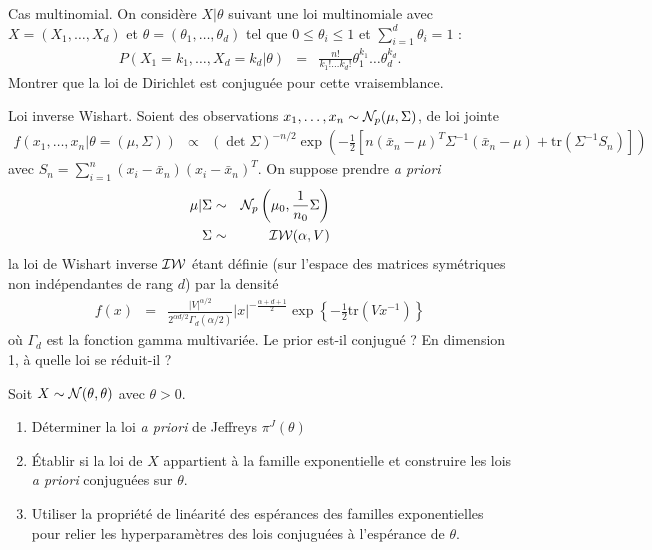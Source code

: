 \begin{exec}{Cas multinomial.}
On considère $X|\theta$ suivant une loi multinomiale avec $X=(X_1,\ldots,X_d)$ et $\theta=(\theta_1,\ldots,\theta_{d})$ tel que
$0\leq \theta_i \leq 1$ et $\sum_{i=1}^d \theta_i=1$ :
\begin{eqnarray*}
P(X_1=k_1,\ldots,X_d=k_d|\theta) & = & \frac{n!}{k_1!\ldots k_d!} \theta^{k_1}_1\ldots \theta^{k_d}_d.  
\end{eqnarray*}
Montrer que la loi de Dirichlet est conjuguée pour cette vraisemblance.
\end{exec}

\begin{exec}{Loi inverse Wishart.}
Soient des observations $x_1,\ldots,x_n\sim{\cal{N}}_p(\mu,\Sigma)$, de loi jointe
\begin{eqnarray*}
f(x_1,\ldots,x_n|\theta=(\mu,\Sigma)) & \propto & \left(\det \Sigma\right)^{-n/2} \exp\left(-\frac{1}{2}\left[n(\bar{x}_n-\mu)^T \Sigma^{-1} (\bar{x}_n-\mu) + \mbox{tr}(\Sigma^{-1} S_n)\right]\right)
\end{eqnarray*}
avec $S_n=\sum_{i=1}^n (x_i-\bar{x}_n)(x_i-\bar{x}_n)^T$. 
On suppose prendre {\it a priori}
\begin{eqnarray*}
\mu|\Sigma & \sim & {\cal{N}}_p\left(\mu_0,\frac{1}{n_0}\Sigma\right) \\
\Sigma & \sim & {\cal{IW}}(\alpha,V) 
\end{eqnarray*} 
la loi de Wishart inverse ${\cal{IW}}$ étant définie (sur l'espace des matrices symétriques non indépendantes de rang $d$) par la densité
\begin{eqnarray*}
f(x) & = & \frac{|V|^{\alpha/2}}{2^{\alpha d/2} \Gamma_d(\alpha/2)} |x|^{-\frac{\alpha+d+1}{2}} \exp\left\{-\frac{1}{2} \text{tr}\left(V x^{-1}\right)\right\}
\end{eqnarray*}
où $\Gamma_d$ est la fonction gamma multivariée. Le prior est-il conjugué ? En dimension 1, à quelle loi se réduit-il ?
\end{exec}

\if{} \vspace{1cm} 
\fi
\vspace{0.5cm}


\begin{exec}
Soit $X\sim {\cal{N}}(\theta,\theta)$ avec $\theta>0$. 
\begin{enumerate}
\item Déterminer la loi {\it a priori} de Jeffreys $\pi^J(\theta)$
\item \'Etablir si la loi de $X$ appartient à la famille exponentielle et construire les lois {\it a priori} conjuguées sur $\theta$.
\item Utiliser la propriété de linéarité des espérances des familles exponentielles pour relier les hyperparamètres des lois conjuguées à l'espérance de $\theta$.
\end{enumerate}
\end{exec}

